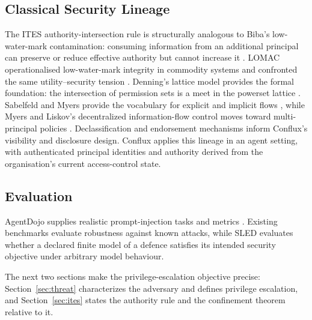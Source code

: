 \documentclass[11pt]{article}
\begin{document}
\subsection{Classical Security Lineage}

The ITES authority-intersection rule is structurally analogous to Biba's
low-water-mark contamination: consuming information from an additional
principal can preserve or reduce effective authority but cannot increase it
\citep{biba1977}. LOMAC operationalised low-water-mark integrity in
commodity systems and confronted the same utility--security tension
\citep{lomac}. Denning's lattice model provides the formal foundation: the
intersection of permission sets is a meet in the powerset lattice
\citep{denning1976}. Sabelfeld and Myers provide the vocabulary for
explicit and implicit flows \citep{sabelfeld2003}, while Myers and Liskov's
decentralized information-flow control moves toward multi-principal policies
\citep{myersliskov}. Declassification and endorsement mechanisms
\citep{declassification-survey,robust-declassification,attacker-control,nonmalleable-ifc}
inform Conflux's visibility and disclosure design. Conflux applies this
lineage in an agent setting, with authenticated principal identities and
authority derived from the organisation's current access-control state.

\subsection{Evaluation}

AgentDojo supplies realistic prompt-injection tasks and metrics
\citep{agentdojo}. Existing benchmarks evaluate robustness against known
attacks, while SLED evaluates whether a declared finite model of a defence
satisfies its intended security objective under arbitrary model behaviour.

The next two sections make the privilege-escalation objective precise:
Section~\ref{sec:threat} characterizes the adversary and defines privilege
escalation, and Section~\ref{sec:ites} states the authority rule and the
confinement theorem relative to it.
\end{document}
